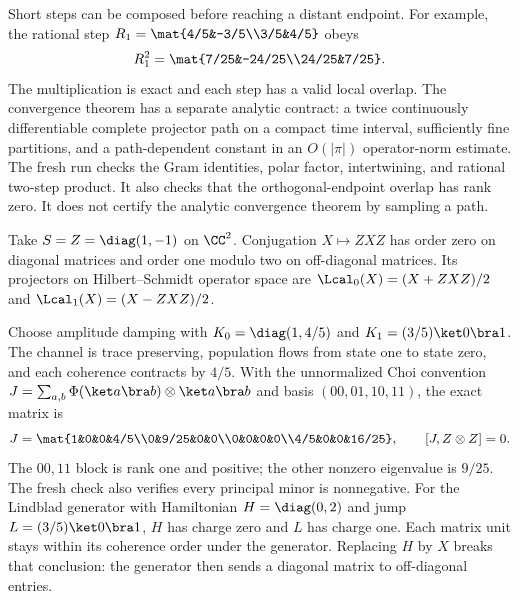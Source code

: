 Short steps can be composed before reaching a distant endpoint. For example, the rational step $R_1=\mat{4/5&-3/5\\3/5&4/5}$ obeys
\[
R_1^2=\mat{7/25&-24/25\\24/25&7/25}.
\]
The multiplication is exact and each step has a valid local overlap. The convergence theorem has a separate analytic contract: a twice continuously differentiable complete projector path on a compact time interval, sufficiently fine partitions, and a path-dependent constant in an $O(|\pi|)$ operator-norm estimate.
The fresh run checks the Gram identities, polar factor, intertwining, and rational two-step product. It also checks that the orthogonal-endpoint overlap has rank zero. It does not certify the analytic convergence theorem by sampling a path.

Take $S=Z=\diag(1,-1)$ on $\CC^2$. Conjugation $X\mapsto ZXZ$ has order zero on diagonal matrices and order one modulo two on off-diagonal matrices. Its projectors on Hilbert--Schmidt operator space are $\Lcal_0(X)=(X+ZXZ)/2$ and $\Lcal_1(X)=(X-ZXZ)/2$.

Choose amplitude damping with $K_0=\diag(1,4/5)$ and $K_1=(3/5)\ket0\bra1$. The channel is trace preserving, population flows from state one to state zero, and each coherence contracts by $4/5$.
With the unnormalized Choi convention $J=\sum_{a,b}\Phi(\ket a\bra b)\otimes\ket a\bra b$ and basis $(00,01,10,11)$, the exact matrix is
\[
J=\mat{1&0&0&4/5\\0&9/25&0&0\\0&0&0&0\\4/5&0&0&16/25},
\qquad [J,Z\otimes Z]=0.
\]
The $00,11$ block is rank one and positive; the other nonzero eigenvalue is $9/25$. The fresh check also verifies every principal minor is nonnegative.
For the Lindblad generator with Hamiltonian $H=\diag(0,2)$ and jump $L=(3/5)\ket0\bra1$, $H$ has charge zero and $L$ has charge one. Each matrix unit stays within its coherence order under the generator. Replacing $H$ by $X$ breaks that conclusion: the generator then sends a diagonal matrix to off-diagonal entries.

